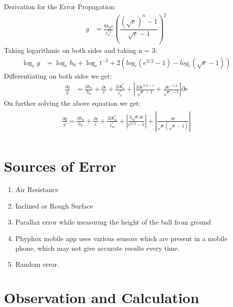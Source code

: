 \documentclass[11pt]{scrartcl} %
\begin{document}
Derivation for the Error Propagation:
\begin{align} 
		g &= \frac{8h_0e}{t_{n}^{*2}}\left(\dfrac{(\sqrt{e})^n-1}{\sqrt{e}-1}\right)^2 \nonumber
\end{align}
    Taking logarithmic on both sides and taking n = 3:
\begin{align} 
            \log_e g &= \log_e h_0 + \log_e t^{-2} + 2(log_e ({e^{3/2}-1}) - log_e ({\sqrt{e}-1})) \nonumber
\end{align}
    Differentiating on both sides we get:
\begin{align} 
        \frac{\partial{g}}{g} &= \frac{\partial{h_0}}{h_0} + \frac{\partial{e}}{e} + \frac{2\partial{t_n^*}}{t_n^*} + \left|\frac{3\partial{e^{3/2-1}}}{\sqrt{e}-1} + \frac{\partial{e^{-1/2}}}{\sqrt{e}-1}\right|\partial{e} \nonumber
\end{align}
   On further solving the above equation we get:
\begin{align} 
	\begin{split}
		\boxed{\frac{\partial{g}}{g} = \frac{\partial{h_0}}{h_0} + \frac{\partial{e}}{e}+\frac{2\partial{t_m^*}}{t_m^*}+\left|\frac{3\sqrt{e}\partial{e}}{e^{3/2}-1}\right|+\left|\frac{\partial{e}}{\sqrt{e}(\sqrt{e}-1)}\right|}\\
	\end{split}					
\end{align}



\section{Sources of Error}
\begin{enumerate}
	\item Air Resistance
	\item Inclined or Rough Surface
	\item Parallax error while measuring the height of the ball from ground
	\item Phyphox mobile app uses various sensors which are present in a mobile phone, which may not give accurate results every time.
	\item Random error.
\end{enumerate}
\newpage

\section{Observation and Calculation}
\end{document}
